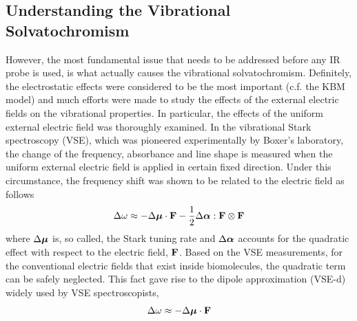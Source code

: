 \documentclass[a4paper,titlepage,twoside,fleqn,12pt]{book}
\newcommand{\BM}[1]{\ensuremath{\mbox{\boldmath${#1}$}}}
\begin{document}
\begin{refsection}
\section{Understanding the Vibrational Solvatochromism}
%
However, the most fundamental issue that needs to be addressed 
before any IR probe is used, is what actually causes the vibrational solvatochromism.
Definitely, the electrostatic effects were considered to be the most important
(c.f. the KBM model) and much efforts were made to study the effects of the external
electric fields on the vibrational properties.\citep{Kim.Cho.ChemRev.2013} 
In particular, the effects of the
uniform external electric field was thoroughly examined.\citep{Hush.Reimers.JPC.1995,
Reimers.Zeng.Hush.JPC.1996,Andrews.Boxer.JCPA.2002,Cho.JCP.2009} 
In the vibrational Stark spectroscopy (VSE)\citep{Hush.Reimers.JPC.1995,Reimers.Zeng.Hush.JPC.1996}, 
which was pioneered experimentally by Boxer's laboratory\citep{Bublitz.Boxer.AnnuRevPhysChem.1997}, 
the change of the frequency, absorbance
and line shape is measured when the uniform external electric field is applied in certain fixed direction.
Under this circumstance, the frequency shift
was shown to be related to the electric field as follows\citep{Hush.Reimers.JPC.1995,Reimers.Zeng.Hush.JPC.1996}
%
\begin{equation} \label{e:vse-shift-full}
 \Delta \omega \approx - \Delta {\BM \mu} \cdot {\bf F} - \frac{1}{2} \Delta {\BM \alpha} : {\bf F} \otimes {\bf F}
\end{equation}
%
where $\Delta {\BM \mu}$ is, so called, the Stark tuning rate
and $\Delta {\BM \alpha}$ accounts for the quadratic effect with respect to 
the electric field, ${\bf F}$. 
Based on the VSE measurements, for the conventional
electric fields that exist inside biomolecules, the quadratic term
can be safely neglected. 
This fact gave rise to the dipole approximation (VSE-d)
widely used by VSE spectroscopists,
%
\begin{equation} \label{e:vse-shift-dipole}
 \Delta \omega \approx - \Delta {\BM \mu} \cdot {\bf F}

\end{equation}
\end{refsection}
\end{document}
